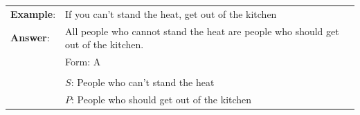 \begin{longtabu}{p{.1\linewidth}p{.9\linewidth}}
\textbf{Example}: & If you can't stand the heat, get out of the kitchen \\
\textbf{Answer}:  & All people who cannot stand the heat are people who should get out of the kitchen. \\
& Form: A\\
&
\noindent {}\\
& $S$: People who can't stand the heat\\
& $P$: People who should get out of the kitchen

\end{longtabu}

